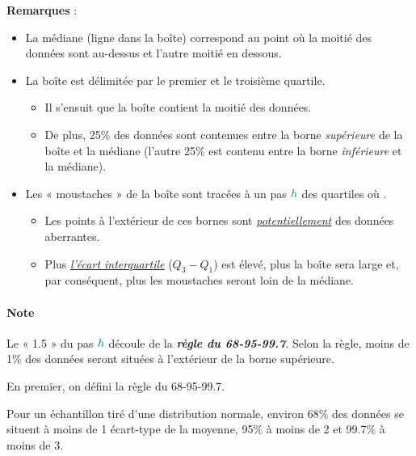 \documentclass[french]{article}
\begin{document}
\begin{multicols*}{2}
\textbf{Remarques} :
\begin{itemize}
	\item	La médiane (ligne dans la boîte) correspond au point où la moitié des données sont au-dessus et l'autre moitié en dessous.
	\item	La boîte est délimitée par le premier et le troisième quartile.
		\begin{itemize}
		\item	Il s'ensuit que la boîte contient la moitié des données.
		\item	De plus, 25\% des données sont contenues entre la borne \textit{supérieure} de la boîte et la médiane (l'autre 25\% est contenu entre la borne \textit{inférieure} et la médiane).
		\end{itemize}
	\item	Les « moustaches » de la boîte sont tracées à un pas $\textcolor{teal}{h}$ des quartiles où .
		\begin{itemize}
		\item	Les points à l'extérieur de ces bornes sont \textit{\underline{potentiellement}} des données aberrantes.
		\item	Plus \textit{\color{bleudefrance}\underline{\hyperlink{IQR}{\color{bleudefrance} l'écart interquartile}}} ($Q_{3}	-	Q_{1}$) est élevé, plus la boîte sera large et, par conséquent, plus les moustaches seront loin de la médiane.
		\end{itemize}
\end{itemize}

\paragraph{Note}	Le « 1.5 » du pas $\textcolor{teal}{h}$ découle de la \textit{\textbf{règle du 68-95-99.7}}. Selon la règle, moins de 1\% des données seront situées à l'extérieur de la borne supérieure.

\bigskip

En premier, on défini la règle du 68-95-99.7.

\begin{definitionNOHFILLprop}[Règle du 68-95-99.7]
Pour un échantillon tiré d'une distribution normale, environ 68\% des données se situent à moins de 1 écart-type de la moyenne, 95\% à moins de 2 et 99.7\% à moins de 3.

\begin{center}	
\begin{tikzpicture}[x=0.75pt,y=0.75pt,yscale=-1,xscale=1]


\end{tikzpicture}
\end{center}
\end{definitionNOHFILLprop}
\end{multicols*}
\end{document}
